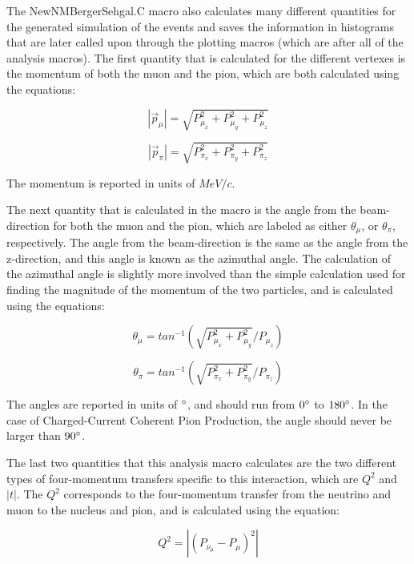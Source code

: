 \documentclass[11pt]{article}
\begin{document}
The NewNMBergerSehgal.C macro also calculates many different quantities for the generated simulation of the events and saves the information in histograms that are later called upon through the plotting macros (which are after all of the analysis macros). The first quantity that is calculated for the different vertexes is the momentum of both the muon and the pion, which are both calculated using the equations:

\begin{equation}
|\vec{p}_\mu| = \sqrt{P_{\mu_x}^2 + P_{\mu_y}^2 + P_{\mu_z}^2}
\end{equation}

\begin{equation}
|\vec{p}_\pi| = \sqrt{P_{\pi_x}^2 + P_{\pi_y}^2 + P_{\pi_z}^2}
\end{equation}

\noindent
The momentum is reported in units of $MeV/c$.

The next quantity that is calculated in the macro is the angle from the beam-direction for both the muon and the pion, which are labeled as either $\theta_\mu$, or $\theta_\pi$, respectively. The angle from the beam-direction is the same as the angle from the z-direction, and this angle is known as the azimuthal angle. The calculation of the azimuthal angle is slightly more involved than the simple calculation used for finding the magnitude of the momentum of the two particles, and is calculated using the equations:

\begin{equation}
\theta_\mu = tan^{-1}(\sqrt{P_{\mu_x}^2 + P_{\mu_y}^2}/{P_{\mu_z}})
\end{equation}

\begin{equation}
\theta_\pi = tan^{-1}(\sqrt{P_{\pi_x}^2 + P_{\pi_y}^2}/{P_{\pi_z}})
\end{equation}

\noindent
The angles are reported in units of $\degree$, and should run from $0\degree$ to $180\degree$. In the case of Charged-Current Coherent Pion Production, the angle should never be larger than $90\degree$.

The last two quantities that this analysis macro calculates are the two different types of four-momentum transfers specific to this interaction, which are $Q^2$ and $|t|$. The $Q^2$ corresponds to the four-momentum transfer from the neutrino and muon to the nucleus and pion, and is calculated using the equation:

\begin{equation}
Q^2 = |(P_{\nu_\mu} - P_\mu)^2|
\end{equation}
\end{document}
